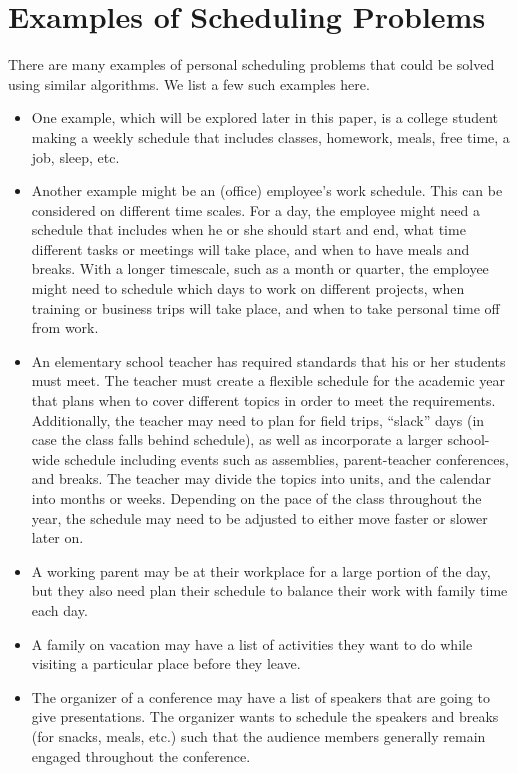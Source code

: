 \documentclass{article}
\begin{document}
\section{Examples of Scheduling Problems}
 	There are many examples of personal scheduling problems that could be solved using similar algorithms. We list a few such examples here.
 	\begin{itemize}
 	\item 
		One example, which will be explored later in this paper, is a college student making a weekly schedule that includes classes, homework, meals, free time, a job, sleep, etc.	
 	\item 
	 	Another example might be an (office) employee's work schedule. This can be considered on different time scales. For a day, the employee might need a schedule that includes when he or she should start and end, what time different tasks or meetings will take place, and when to have meals and breaks. With a longer timescale, such as a month or quarter, the employee might need to schedule which days to work on different projects, when training or business trips will take place, and when to take personal time off from work.
 	\item 
	 	An elementary school teacher has required standards that his or her students must meet. The teacher must create a flexible schedule for the academic year that plans when to cover different topics in order to meet the requirements. Additionally, the teacher may need to plan for field trips, ``slack'' days (in case the class falls behind schedule), as well as incorporate a larger school-wide schedule including events such as assemblies, parent-teacher conferences, and breaks. The teacher may divide the topics into units, and the calendar into months or weeks. Depending on the pace of the class throughout the year, the schedule may need to be adjusted to either move faster or slower later on.
	\item
		A working parent may be at their workplace for a large portion of the day, but they also need plan their schedule to balance their work with family time each day.
 	\item
	 	A family on vacation may have a list of activities they want to do while visiting a particular place before they leave.
	\item
	 	The organizer of a conference may have a list of speakers that are going to give presentations. The organizer wants to schedule the speakers and breaks (for snacks, meals, etc.) such that the audience members generally remain engaged throughout the conference.

\end{itemize}
\end{document}
